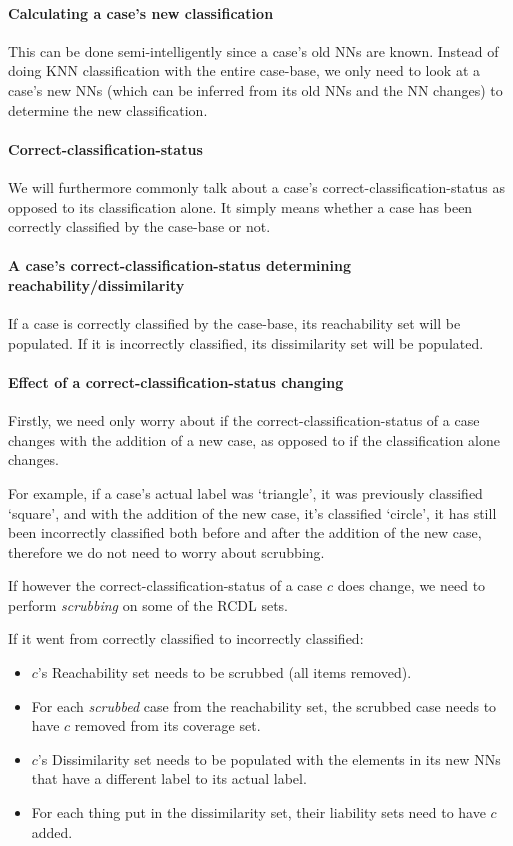 \documentclass[a4paper,11pt]{report}
\begin{document}
\paragraph{Calculating a case's new classification}
This can be done semi-intelligently since a case's old NNs are known. Instead of doing KNN classification with the entire case-base, we only need to look at a case's new NNs (which can be inferred from its old NNs and the NN changes) to determine the new classification.

\paragraph{Correct-classification-status}
We will furthermore commonly talk about a case's correct-classification-status as opposed to its classification alone. It simply means whether a case has been correctly classified by the case-base or not. 

\paragraph{A case's correct-classification-status determining reachability/dissimilarity}
If a case is correctly classified by the case-base, its reachability set will be populated. If it is incorrectly classified, its dissimilarity set will be populated.
 
\paragraph{Effect of a correct-classification-status changing}
Firstly, we need only worry about if the correct-classification-status of a case changes with the addition of a new case, as opposed to if the classification alone changes.

For example, if a case's actual label was `triangle', it was previously classified `square', and with the addition of the new case, it's classified `circle', it has still been incorrectly classified both before and after the addition of the new case, therefore we do not need to worry about scrubbing.

If however the correct-classification-status of a case $c$ does change, we need to perform \emph{scrubbing} on some of the RCDL sets.

If it went from correctly classified to incorrectly classified:
\begin{itemize}
	\item $c$'s Reachability set needs to be scrubbed (all items removed).
	\item For each \emph{scrubbed} case from the reachability set, the scrubbed case needs to have $c$ removed from its coverage set.
	\item $c$'s Dissimilarity set needs to be populated with the elements in its new NNs that have a different label to its actual label.
	\item For each thing put in the dissimilarity set, their liability sets need to have $c$ added.
\end{itemize}
\end{document}
